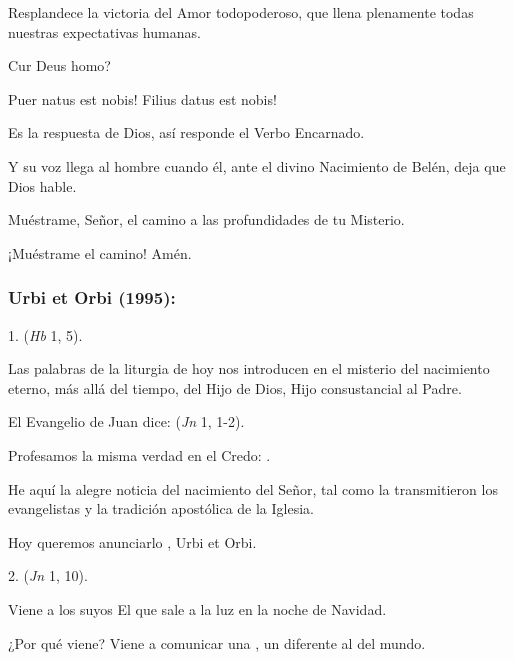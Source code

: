 \begin{body}
\begin{body}
		Resplandece la victoria del Amor todopoderoso, que llena plenamente todas nuestras expectativas humanas.
		
		Cur Deus homo?
		
		Puer natus est nobis! Filius datus est nobis!
		
		Es la respuesta de Dios, así responde el Verbo Encarnado.
		
		Y su voz llega al hombre cuando él, ante el divino Nacimiento de Belén, deja que Dios hable.
		
		Muéstrame, Señor, el camino a las profundidades de tu Misterio.
		
		¡Muéstrame el camino! Amén.
	\end{body}
	
	\subsubsection{Urbi et Orbi (1995): }
	
	\begin{body}
		1.  (\emph{Hb} 1, 5).
		
		Las palabras de la liturgia de hoy nos introducen en el misterio del nacimiento eterno, más allá del tiempo, del Hijo de Dios, Hijo consustancial al Padre.
		
		El Evangelio de Juan dice:  (\emph{Jn} 1, 1-2).
		
		Profesamos la misma verdad en el Credo: .
		
		He aquí la alegre noticia del nacimiento del Señor, tal como la transmitieron los evangelistas y la tradición apostólica de la Iglesia.
		
		Hoy queremos anunciarlo , Urbi et Orbi.
		
		2.  (\emph{Jn} 1, 10).
		
		Viene a los suyos El que sale a la luz en la noche de Navidad.
		
		¿Por qué viene? Viene a comunicar una , un  diferente al del mundo.
		

\end{body}
\end{body}
